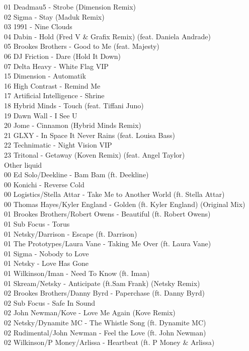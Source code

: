 \begin{multicols}{2}
 01 Deadmau5 - Strobe (Dimension Remix)\\ 02 Sigma - Stay (Maduk Remix)\\ 03 1991 - Nine Clouds\\ 04 Dabin - Hold (Fred V \& Grafix Remix) (feat. Daniela Andrade)\\ 05 Brookes Brothers - Good to Me (feat. Majesty)\\ 06 DJ Friction - Dare (Hold It Down)\\ 07 Delta Heavy - White Flag VIP\\ 15 Dimension - Automatik\\ 16 High Contrast - Remind Me\\ 17 Artificial Intelligence - Shrine\\ 18 Hybrid Minds - Touch (feat. Tiffani Juno)\\ 19 Dawn Wall - I See U\\ 20 Jome - Cinnamon (Hybrid Minds Remix)\\ 21 GLXY - In Space It Never Rains (feat. Louisa Bass)\\ 22 Technimatic - Night Vision VIP\\ 23 Tritonal - Getaway (Koven Remix) (feat. Angel Taylor)\\
 \large Other liquid \normalsize\\
 00 Ed Solo/Deekline - Bam Bam (ft. Deekline)\\ 00 Konichi - Reverse Cold\\ 00 Logistics/Stella Attar - Take Me to Another World (ft. Stella Attar)\\ 00 Thomas Hayes/Kyler England - Golden (ft. Kyler England) (Original Mix)\\ 01 Brookes Brothers/Robert Owens - Beautiful (ft. Robert Owens)\\ 01 Sub Focus - Torus\\ 01 Netsky/Darrison - Escape (ft. Darrison)\\ 01 The Prototypes/Laura Vane - Taking Me Over (ft. Laura Vane)\\ 01 Sigma - Nobody to Love\\ 01 Netsky - Love Has Gone\\ 01 Wilkinson/Iman - Need To Know (ft. Iman)\\ 01 Skream/Netsky - Anticipate (ft.Sam Frank) (Netsky Remix)\\ 02 Brookes Brothers/Danny Byrd - Paperchase (ft. Danny Byrd)\\ 02 Sub Focus - Safe In Sound\\ 02 John Newman/Kove - Love Me Again (Kove Remix)\\ 02 Netsky/Dynamite MC - The Whistle Song (ft. Dynamite MC)\\ 02 Rudimental/John Newman - Feel the Love (ft. John Newman)\\ 02 Wilkinson/P Money/Arlissa - Heartbeat (ft. P Money \& Arlissa)\\

\end{multicols}
